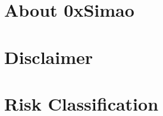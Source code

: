 \hypertarget{about-0xsimao}{%
\section{About 0xSimao}\label{about-0xsimao}}



\hypertarget{disclaimer}{%
\section{Disclaimer}\label{disclaimer}}



\hypertarget{risk-classification}{%
\section{Risk Classification}\label{risk-classification}}


